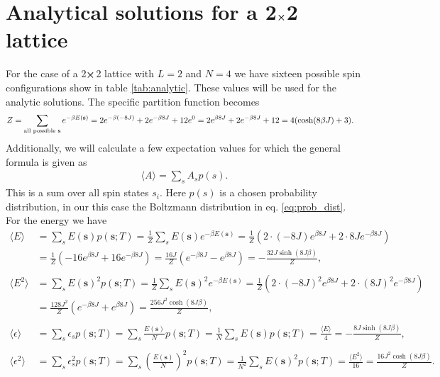 \documentclass[english,notitlepage,reprint,nofootinbib]{revtex4-1}  %
\begin{document}
\section{Analytical solutions for a 2$\cross$2 lattice}\label{appendix:analytic}
For the case of a 2$\cross$2 lattice with $L=2$ and $N=4$ we have sixteen possible spin configurations show in table \ref{tab:analytic}. These values will be used for the analytic solutions. The specific partition function becomes
\begin{align*}
    Z &=  \sum_{\text{all possible \textbf{s}}} e^{- \beta E(\textbf{s})} 
    = 2e^{- \beta (-8J)} + 2e^{- \beta 8J} + 12e^0 
    = 2 e^{\beta 8J} + 2 e^{- \beta 8J} + 12 
    = 4 (\cosh(8 \beta J) + 3).
\end{align*}
Additionally, we will calculate a few expectation values for which the general formula is given as
\begin{align*}
    \langle A \rangle = \sum_s A_s p(s).
\end{align*}
This is a sum over all spin states $s_i$. Here $p(s)$ is a chosen probability distribution, in our this case the Boltzmann distribution in eq. \ref{eq:prob_dist}. For the energy we have
\begin{align*}
    \langle E \rangle &=  \sum_s E(\textbf{s})  p(\textbf{s};T) 
    = \frac{1}{Z} \sum_s E(\textbf{s})  e^{-\beta E(\textbf{s})} 
    = \frac{1}{Z} \left( 2 \cdot (-8J)e^{\beta8J} + 2 \cdot 8J e^{-\beta 8J}\right) \\
    &= \frac{1}{Z} \left( -16 e^{\beta8J} + 16 e^{-\beta 8J}\right)
    = \frac{16J}{Z} \left( e^{-\beta 8J} - e^{\beta 8J} \right)
    = - \frac{32 J \sinh(8J \beta )}{Z},
\\
\\
    \langle E^2 \rangle &=  \sum_s E(\textbf{s})^2  p(\textbf{s};T)
    = \frac{1}{Z} \sum_s E(\textbf{s})^2  e^{-\beta E(\textbf{s})} 
    = \frac{1}{Z} \left( 2 \cdot (-8J)^2e^{\beta8J} + 2 \cdot (8J)^2 e^{-\beta 8J}\right) \\
    &= \frac{128 J^2}{Z} \left( e^{-\beta 8J} + e^{\beta 8J} \right)
    = \frac{256 J^2 \cosh(8J \beta)}{Z},
\\
\\
    \langle \epsilon \rangle &=  \sum_s \epsilon_s  p(\textbf{s};T)
    =  \sum_s \frac{E(\textbf{s})}{N}  p(\textbf{s};T)
    =  \frac{1}{N} \sum_s E(\textbf{s})  p(\textbf{s};T)
    =  \frac{\langle E \rangle }{4}
    = - \frac{8J \sinh(8J \beta)}{Z},
\\
\\
    \langle \epsilon^2 \rangle &=  \sum_s \epsilon_s^2  p(\textbf{s};T)
    =  \sum_s \left(\frac{E(\textbf{s})}{N}\right)^2  p(\textbf{s};T) 
    =  \frac{1}{N^2} \sum_s E(\textbf{s})^2  p(\textbf{s};T)
    =  \frac{\langle E^2 \rangle }{16}
    = \frac{16 J^2 \cosh(8J \beta)}{Z}.
\end{align*}
\end{document}
